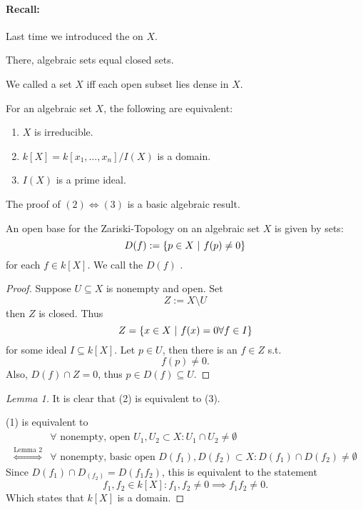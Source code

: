
\paragraph{Recall:} Last time we introduced the  on $X$.

There, algebraic sets equal closed sets.

We called a set $X$  iff each open subset lies dense in $X$.


\begin{lemma}
	For an algebraic set $X$, the following are equivalent:
	\begin{enumerate}[(1)]
		\item $X$ is irreducible.
		\item $k[X] = k[x_1, \ldots, x_n] / I(X)$ is a domain.
		\item $I(X)$ is a prime ideal.
	\end{enumerate}
\end{lemma}
The proof of $(2) \iff (3)$ is a basic algebraic result.

\begin{lemma}
	An open base for the Zariski-Topology on an algebraic set $X$ is given by sets:
	\[ D(f) := \left\lbrace p \in X ~ | ~ f(p) \neq 0\right\rbrace \]
	for each $f \in k[X]$. We call the $D(f)$ .
\end{lemma}
\begin{proof}
	Suppose $U \subseteq X$ is nonempty and open. Set
	\[ Z:= X \setminus U\]
	then $Z$ is closed.
	Thus
	\[ Z = \left\lbrace x \in X ~ | ~ f(x) = 0 \forall f \in  I\right\rbrace \]
	for some ideal $I \subseteq k[X]$. Let $p \in U$, then there is an $f \in Z$ s.t.
	\[f (p) \neq 0. \]
	Also, $D(f) \cap Z = 0$, thus $p \in D(f) \subseteq U$.
\end{proof}

\begin{proof}[Lemma 1]
	It is clear that (2) is equivalent to (3).
	
	(1) is equivalent to
	\begin{align*}
	& \forall \text{ nonempty, open }U_1, U_2\subset X: U_1\cap U_2 \neq \emptyset\\
\overset{\text{Lemma 2}}{\iff}	& \forall \text{ nonempty, basic open }D(f_1), D(f_2)\subset X: D(f_1) \cap D(f_2) \neq \emptyset
	\end{align*}
	Since $D(f_1)\cap D_(f_2) = D(f_1f_2)$, this is equivalent to the statement
	\[f_1, f_2 \in k[X]: f_1, f_2 \neq 0 \implies f_1f_2 \neq 0. \]
	Which states that $k[X]$ is a domain.
\end{proof}

